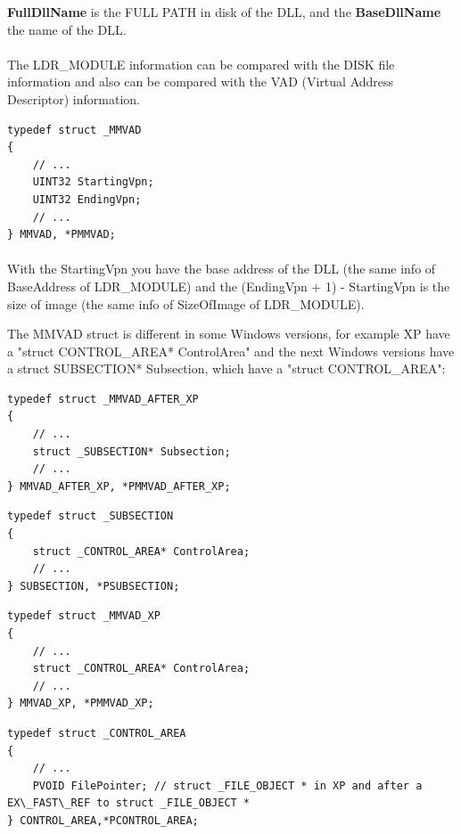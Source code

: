 \documentclass[12pt,a4paper,english]{book}
\newcommand{\paraph}{\paragraph{}}
\begin{document}
{\bf FullDllName} is the FULL PATH in disk of the DLL, and the {\bf BaseDllName} the name of the DLL.

\paraph{}
The LDR\_MODULE information can be compared with the DISK file information and also can be compared with the VAD (Virtual Address Descriptor) information.

\lstset{language=C,caption=MMVAD data useful for the detection}
\begin{lstlisting}
typedef struct _MMVAD
{
    // ...
    UINT32 StartingVpn;
    UINT32 EndingVpn;
    // ...
} MMVAD, *PMMVAD;
\end{lstlisting}

\paraph{}
With the StartingVpn you have the base address of the DLL (the same info of BaseAddress of LDR\_MODULE) and the (EndingVpn + 1) - StartingVpn is the size of image (the same info of SizeOfImage of LDR\_MODULE).

The MMVAD struct is different in some Windows versions, for example XP have a "struct CONTROL\_AREA* ControlArea" and the next Windows versions have a struct SUBSECTION* Subsection, which have a "struct CONTROL\_AREA":

\lstset{language=C,caption=MMVAD data after XP have a pointer to SubSection}
\begin{lstlisting}
typedef struct _MMVAD_AFTER_XP
{
    // ...
    struct _SUBSECTION* Subsection;
    // ...
} MMVAD_AFTER_XP, *PMMVAD_AFTER_XP;
\end{lstlisting}


\lstset{language=C,caption=SUBSECTION structure}
\begin{lstlisting}
typedef struct _SUBSECTION
{
    struct _CONTROL_AREA* ControlArea;
    // ...
} SUBSECTION, *PSUBSECTION;
\end{lstlisting}

\lstset{language=C,caption=MMVAD data in XP have a pointer to ControlArea}
\begin{lstlisting}
typedef struct _MMVAD_XP
{
    // ...
    struct _CONTROL_AREA* ControlArea;
    // ...
} MMVAD_XP, *PMMVAD_XP;
\end{lstlisting}

\lstset{language=C,caption=ControlArea struct}
\begin{lstlisting}
typedef struct _CONTROL_AREA
{
    // ...
    PVOID FilePointer; // struct _FILE_OBJECT * in XP and after a EX\_FAST\_REF to struct _FILE_OBJECT *
} CONTROL_AREA,*PCONTROL_AREA;
\end{lstlisting}
\end{document}
